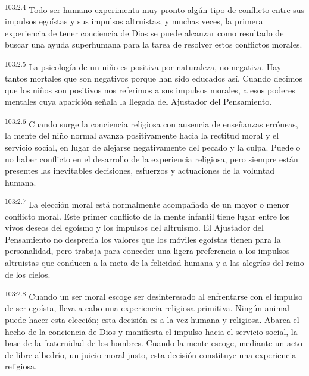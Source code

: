 \par
\textsuperscript{103:2.4} Todo ser humano experimenta muy pronto algún tipo de conflicto entre sus impulsos egoístas y sus impulsos altruistas, y muchas veces, la primera experiencia de tener conciencia de Dios se puede alcanzar como resultado de buscar una ayuda superhumana para la tarea de resolver estos conflictos morales.

\par
\textsuperscript{103:2.5} La psicología de un niño es positiva por naturaleza, no negativa. Hay tantos mortales que son negativos porque han sido educados así. Cuando decimos que los niños son positivos nos referimos a sus impulsos morales, a esos poderes mentales cuya aparición señala la llegada del Ajustador del Pensamiento.

\par
\textsuperscript{103:2.6} Cuando surge la conciencia religiosa con ausencia de enseñanzas erróneas, la mente del niño normal avanza positivamente hacia la rectitud moral y el servicio social, en lugar de alejarse negativamente del pecado y la culpa. Puede o no haber conflicto en el desarrollo de la experiencia religiosa, pero siempre están presentes las inevitables decisiones, esfuerzos y actuaciones de la voluntad humana.

\par
\textsuperscript{103:2.7} La elección moral está normalmente acompañada de un mayor o menor conflicto moral. Este primer conflicto de la mente infantil tiene lugar entre los vivos deseos del egoísmo y los impulsos del altruismo. El Ajustador del Pensamiento no desprecia los valores que los móviles egoístas tienen para la personalidad, pero trabaja para conceder una ligera preferencia a los impulsos altruistas que conducen a la meta de la felicidad humana y a las alegrías del reino de los cielos.

\par
\textsuperscript{103:2.8} Cuando un ser moral escoge ser desinteresado al enfrentarse con el impulso de ser egoísta, lleva a cabo una experiencia religiosa primitiva. Ningún animal puede hacer esta elección; esta decisión es a la vez humana y religiosa. Abarca el hecho de la conciencia de Dios y manifiesta el impulso hacia el servicio social, la base de la fraternidad de los hombres. Cuando la mente escoge, mediante un acto de libre albedrío, un juicio moral justo, esta decisión constituye una experiencia religiosa.

